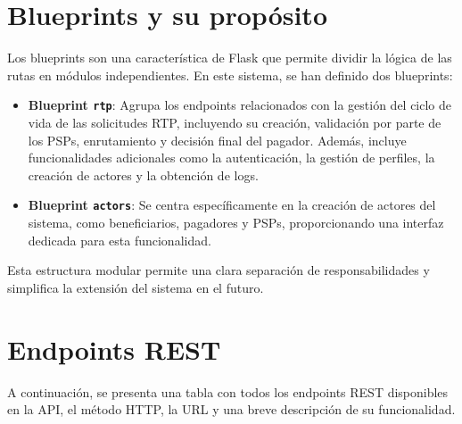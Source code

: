 \section{Blueprints y su propósito}

Los blueprints son una característica de Flask que permite dividir la lógica de las rutas en módulos independientes. En este sistema, se han definido dos blueprints:

\begin{itemize}
    \item \textbf{Blueprint \texttt{rtp}}: Agrupa los endpoints relacionados con la gestión del ciclo de vida de las solicitudes RTP, incluyendo su creación, validación por parte de los PSPs, enrutamiento y decisión final del pagador. Además, incluye funcionalidades adicionales como la autenticación, la gestión de perfiles, la creación de actores y la obtención de logs.
    \item \textbf{Blueprint \texttt{actors}}: Se centra específicamente en la creación de actores del sistema, como beneficiarios, pagadores y PSPs, proporcionando una interfaz dedicada para esta funcionalidad.
\end{itemize}

Esta estructura modular permite una clara separación de responsabilidades y simplifica la extensión del sistema en el futuro.

\section{Endpoints REST}

A continuación, se presenta una tabla con todos los endpoints REST disponibles en la API, el método HTTP, la URL y una breve descripción de su funcionalidad.

